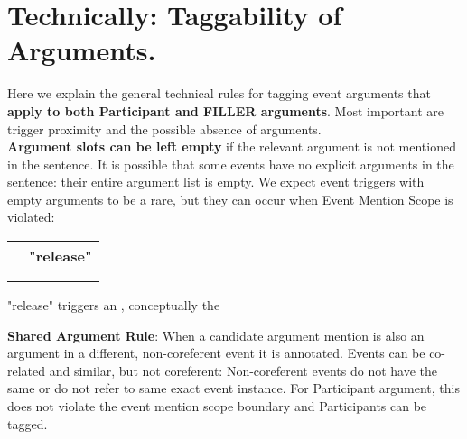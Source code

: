 \section{Technically: Taggability of Arguments.}
Here we explain the general technical rules for tagging event arguments that \textbf{apply to both Participant and FILLER arguments}.
Most important are trigger proximity and the possible absence of arguments.\\

\noindent\textbf{Argument slots can be left empty} if the relevant argument is not mentioned in the sentence.
It is possible that some events have no explicit arguments in the sentence: their entire argument list is empty.
We expect event triggers with empty arguments to be a rare, but they can occur when Event Mention Scope is violated: 
\begin{exe}
\ex {}
    \expl \begin{tabular}{|L{6cm}|L{7cm}|} \hline
         & "release" \\\hline
         & \\
         & \\
        \hline \end{tabular}
    \expl "release" triggers an , conceptually the 
\end{exe}

\noindent\textbf{Shared Argument Rule}:
When a candidate argument mention is also an argument in a different, non-coreferent event it is annotated.
Events can be co-related and similar, but not coreferent:
Non-coreferent events do not have the same  or do not refer to same exact event instance.
For Participant argument, this does not violate the event mention scope boundary and Participants can be tagged.

